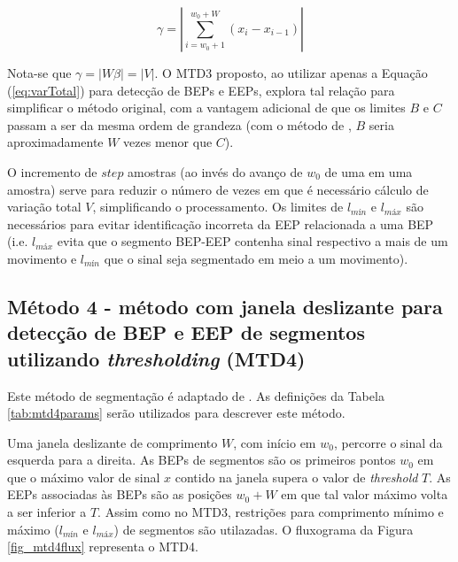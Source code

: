 \begin{equation}
\label{eq:absVarTotal}
	\gamma = \left|\sum\limits_{i=w_0+1}^{w_0+W} (x_i - x_{i-1})\right|
\end{equation}

Nota-se que $\gamma = |W\beta| = |V|$. O MTD3 proposto, ao utilizar apenas a Equação (\ref{eq:varTotal}) para detecção de BEPs e EEPs, explora tal relação para simplificar o método original, com a vantagem adicional de que os limites $B$ e $C$ passam a ser da mesma ordem de grandeza (com o método de \cite{Gut2000}, $B$ seria aproximadamente $W$ vezes menor que $C$).

O incremento de $step$ amostras (ao invés do avanço de $w_0$ de uma em uma amostra) serve para reduzir o número de vezes em que é necessário cálculo de variação total $V$, simplificando o processamento. Os limites de $l_{mín}$ e $l_{máx}$ são necessários para evitar identificação incorreta da EEP relacionada a uma BEP (i.e. $l_{máx}$ evita que o segmento BEP-EEP contenha sinal respectivo a mais de um movimento e $l_{mín}$ que o sinal seja segmentado em meio a um movimento).

			\subsection{Método 4 - método com janela deslizante para detecção de BEP e EEP de segmentos utilizando \emph{thresholding} (MTD4)}
Este método de segmentação é adaptado de \cite{Pattichis1995}. As definições da Tabela \ref{tab:mtd4params} serão utilizados para descrever este método.



Uma janela deslizante de comprimento $W$, com início em $w_0$, percorre o sinal da esquerda para a direita. As BEPs de segmentos são os primeiros pontos $w_0$ em que o máximo valor de sinal $x$ contido na janela supera o valor de \emph{threshold} $T$. As EEPs associadas às BEPs são as posições $w_0 + W$ em que tal valor máximo volta a ser inferior a $T$. Assim como no MTD3, restrições para comprimento mínimo e máximo ($l_{mín}$ e $l_{máx}$) de segmentos são utilazadas. O fluxograma da Figura \ref{fig_mtd4flux} representa o MTD4.



